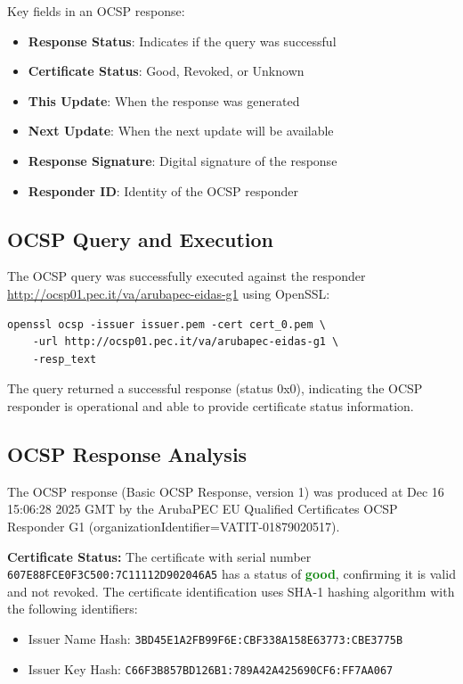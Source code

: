 \documentclass[12pt,a4paper]{article}
\begin{document}
Key fields in an OCSP response:
\begin{itemize}
    \item \textbf{Response Status}: Indicates if the query was successful
    \item \textbf{Certificate Status}: Good, Revoked, or Unknown
    \item \textbf{This Update}: When the response was generated
    \item \textbf{Next Update}: When the next update will be available
    \item \textbf{Response Signature}: Digital signature of the response
    \item \textbf{Responder ID}: Identity of the OCSP responder
\end{itemize}

\subsection{OCSP Query and Execution}

The OCSP query was successfully executed against the responder \url{http://ocsp01.pec.it/va/arubapec-eidas-g1} using OpenSSL:

\begin{lstlisting}[style=bashstyle]
openssl ocsp -issuer issuer.pem -cert cert_0.pem \
    -url http://ocsp01.pec.it/va/arubapec-eidas-g1 \
    -resp_text
\end{lstlisting}

The query returned a successful response (status 0x0), indicating the OCSP responder is operational and able to provide certificate status information.

\subsection{OCSP Response Analysis}

The OCSP response (Basic OCSP Response, version 1) was produced at Dec 16 15:06:28 2025 GMT by the ArubaPEC EU Qualified Certificates OCSP Responder G1 (organizationIdentifier=VATIT-01879020517).

\textbf{Certificate Status:} The certificate with serial number \texttt{607E88FCE0F3C500:\allowbreak 7C11112D902046A5} has a status of \textcolor{green}{\textbf{good}}, confirming it is valid and not revoked. The certificate identification uses SHA-1 hashing algorithm with the following identifiers:
\begin{itemize}
    \item Issuer Name Hash: \texttt{3BD45E1A2FB99F6E:\allowbreak CBF338A158E63773:\allowbreak CBE3775B}
    \item Issuer Key Hash: \texttt{C66F3B857BD126B1:\allowbreak 789A42A425690CF6:\allowbreak FF7AA067}
\end{itemize}
\end{document}
